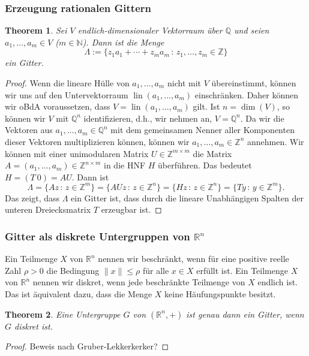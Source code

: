 \documentclass[
a4paper,landscape,16pt,
bibliography=totocnumbered,
numbers=noenddot,
]{scrartcl}
\numberwithin{equation}{subsection}
\newcommand{\N}{\mathbb N}
\newcommand{\Z}{\mathbb Z}
\newcommand{\Q}{\mathbb Q}
\newcommand{\R}{\mathbb R}
\newcommand{\lin}{\operatorname{lin}} %
\theoremstyle{plain}
\newtheorem*{thm}{Theorem}
\theoremstyle{definition}
\begin{document}
\subsubsection{Erzeugung rationalen Gittern} 

\begin{thm}
	Sei $V$ endlich-dimensionaler Vektorraum über $\Q$ und seien $a_1,\ldots,a_m \in V$ ($m \in \N$). Dann ist die Menge
	\[
		\Lambda := \{ z_1 a_1 + \cdots + z_m a_m \,:\, z_1,\ldots,z_m \in \Z \} 
	\]
	ein Gitter. 
\end{thm} 
\begin{proof} 
	Wenn die lineare Hülle von $a_1,\ldots,a_m$ nicht mit $V$ übereinstimmt, können wir uns auf den Untervektorraum $\lin(a_1,\ldots,a_m)$ einschränken. Daher können wir oBdA voraussetzen, dass $V =\lin(a_1,\ldots,a_m)$ gilt. Ist $n=\dim(V)$, so können wir $V$ mit $\Q^n$ identifizieren, d.h., wir nehmen an, $V = \Q^n$. Da wir die Vektoren aus $a_1,\ldots,a_m \in \Q^n$ mit dem gemeinsamen Nenner aller Komponenten dieser Vektoren multiplizieren können, können wir $a_1,\ldots,a_m \in \Z^n$ annehmen. Wir können mit einer unimodularen Matrix $U \in \Z^{m \times m}$ die Matrix $A = (a_1,\ldots,a_m) \in \Z^{n \times m}$ in die HNF $H$ überführen. Das bedeutet $H= (T \ 0) = A U$. Dann ist 
	\[
		\Lambda = \{ A z \,:\, z \in \Z^m \} = \{ A U z \,:\, z \in \Z^n \}  = \{ H z \,:\, z \in \Z^n \} = \{ T y \,:\, y \in \Z^m \}.
	\]
	Das zeigt, dass $\Lambda$ ein Gitter ist, dass durch die lineare Unabhängigen Spalten der unteren Dreiecksmatrix $T$ erzeugbar ist. 
\end{proof} 


\subsubsection{Gitter als diskrete Untergruppen von $\R^n$} 

Ein Teilmenge $X$ von $\R^n$ nennen wir beschränkt, wenn für eine positive reelle Zahl $\rho>0$ die Bedingung $\|x\| \le \rho$ für alle $x \in X$ erfüllt ist. 
Ein Teilmenge $X$ von $\R^n$ nennen wir diskret, wenn jede beschränkte Teilmenge von $X$ endlich ist. Das ist äquivalent dazu, dass die Menge $X$ keine Häufungspunkte besitzt. 

\begin{thm}
	Eine Untergruppe $G$ von $(\R^n,+)$ ist genau dann ein Gitter, wenn $G$ diskret ist. 
\end{thm} 
\begin{proof}
	Beweis nach Gruber-Lekkerkerker?
\end{proof} 
\end{document}
